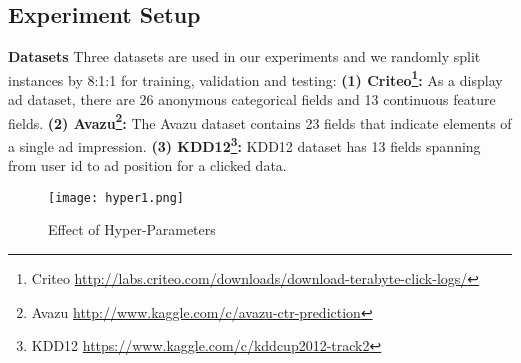 \documentclass[sigconf]{acmart}
\begin{document}
\subsection{Experiment Setup}
\textbf{Datasets}
Three datasets are used in our experiments and we randomly split instances by 8:1:1 for training, validation and testing:
\textbf{(1) Criteo\footnote{Criteo \url{http://labs.criteo.com/downloads/download-terabyte-click-logs/}}:}
  As a display ad dataset, there are 26 anonymous categorical fields and 13 continuous feature fields.
\textbf{(2) Avazu\footnote{Avazu \url{http://www.kaggle.com/c/avazu-ctr-prediction}}:}
The Avazu dataset contains 23 fields that indicate elements of a single ad impression.
\textbf{(3) KDD12\footnote{KDD12 \url{https://www.kaggle.com/c/kddcup2012-track2}}:}
  KDD12 dataset has 13 fields spanning from user id to ad position for a clicked data.
  
\begin{table}
\centering
\caption{Overall performance (AUC) of different models}
\label{tab:overalperformance}
\end{table}
\begin{figure*}[h]
  \centering
\texttt{[image: hyper1.png]}
  \caption{Effect of Hyper-Parameters}
\end{figure*}
\end{document}

